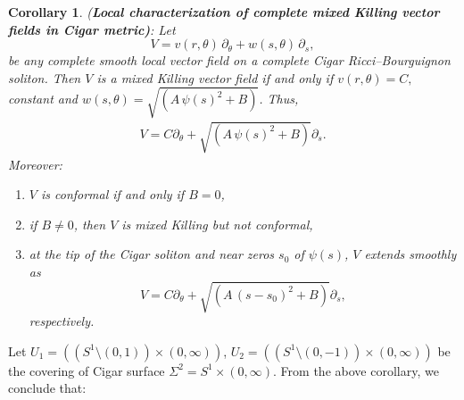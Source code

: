 \documentclass{article}
\newtheorem{corollary}{Corollary}[section]
\theoremstyle{definition}
\theoremstyle{remark}
\begin{document}
\begin{corollary}\label{mkc} {(\bf Local characterization of complete mixed Killing vector fields in Cigar metric)}:
Let 
\[
V =   v(r, \theta)\,\partial_\theta +  w(s, \theta)\,\partial_s,
\]
be any complete smooth local vector field on a complete Cigar Ricci--Bourguignon soliton. 
Then $V$ is a mixed Killing vector field  
if and only if  $v(r, \theta) = C,$ constant and 
 $w(s, \theta) = \sqrt{(A\,\psi(s)^2 + B)}$. Thus,
\begin{eqnarray}\label{mkvf}
 V =  C   \partial_{\theta}  +   \sqrt{(A\,\psi(s)^2 + B)}  \partial_s. 
\end{eqnarray}
Moreover:
\begin{enumerate}
\item $V$ is conformal if and only if $B=0$,
\item if $B\neq 0$, then $V$ is mixed Killing but not conformal,
\item   at the tip of the Cigar soliton and near zeros $s_{0}$ of  $\psi(s)$,  $V$ 
extends smoothly as  
$$ V =    C   \partial_{\theta}  +   \sqrt{(A\, (s-s_{0})^2 + B)}  \partial_s,  $$
respectively.
\end{enumerate}
\end{corollary}

\vspace{0.4in}


Let $U_1 = \left((S^1 \setminus (0, 1)) \times (0, \infty)\right)$, $U_2  = \left((S^1 \setminus (0, -1)) \times (0, \infty)\right)$ be the covering of Cigar surface $\Sigma^2 = S^1 \times (0, \infty)$.
From the above corollary, we conclude that:
\end{document}
